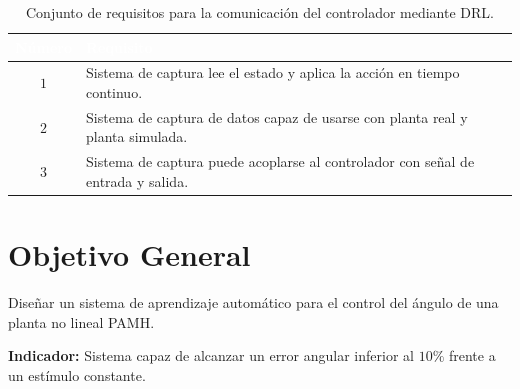 \begin{table}[!h]
\caption{Conjunto de requisitos para la comunicación del controlador mediante DRL.}
\label{tab:requisitos}
\centering
\begin{tabular}{|c|p{11cm}|}
\hline
\centering\cellcolor{tableheader}\textcolor{white}{\textbf{Número}} & {\centering\cellcolor{tableheader}\textcolor{white}{\textbf{Requisito}}} \\ \hline
$1$ & Sistema de captura lee el estado y aplica la acción en tiempo continuo. \\ \hline
$2$ & Sistema de captura de datos capaz de usarse con planta real y planta simulada. \\ \hline
$3$ & Sistema de captura puede acoplarse al controlador con señal de entrada y salida. \\ \hline
\end{tabular}
\end{table}



\section{Objetivo General}

Diseñar un sistema de aprendizaje automático para el control del ángulo de una planta no lineal PAMH.

\textbf{Indicador:} Sistema capaz de alcanzar un error angular inferior al $10\%$ frente a un estímulo constante. 

